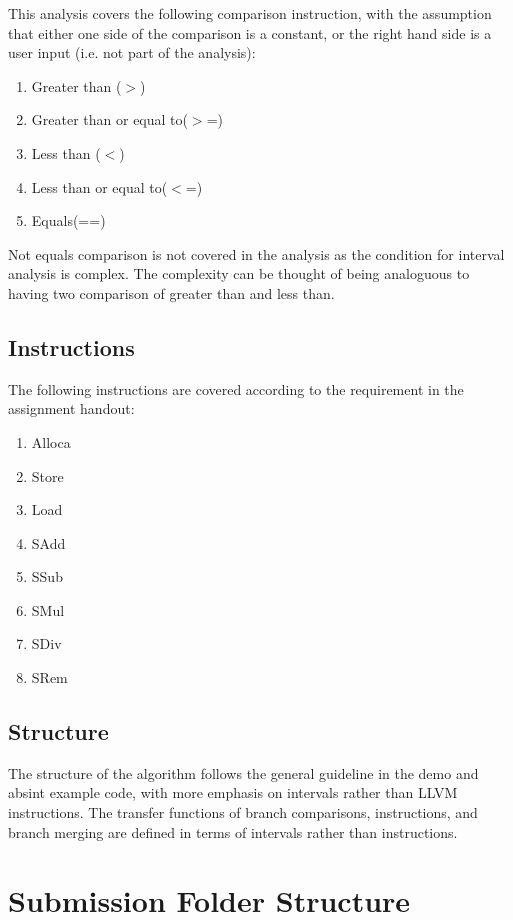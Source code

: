 \documentclass[11pt,a4paper,fleqn]{article}
\begin{document}
This analysis covers the following comparison instruction, with the assumption that either one side of the comparison is a constant, or the right hand side is a user input (i.e. not part of the analysis):

\begin{enumerate}
   \item Greater than ($>$)
   \item Greater than or equal to($>$=)
   \item Less than ($<$)
   \item Less than or equal to($<$=)
   \item Equals(==)
\end{enumerate}

Not equals comparison is not covered in the analysis as the condition for interval analysis is complex.
The complexity can be thought of being analoguous to having two comparison of greater than and less than.

\subsection{Instructions}

The following instructions are covered according to the requirement in the assignment handout:

\begin{enumerate}
   \item Alloca
   \item Store
   \item Load
   \item SAdd
   \item SSub
   \item SMul
   \item SDiv
   \item SRem
\end{enumerate}

\subsection {Structure}

The structure of the algorithm follows the general guideline in the demo and absint example code, with more emphasis on intervals rather than LLVM instructions.
The transfer functions of branch comparisons, instructions, and branch merging are defined in terms of intervals rather than instructions.

\section{Submission Folder Structure}
\end{document}
